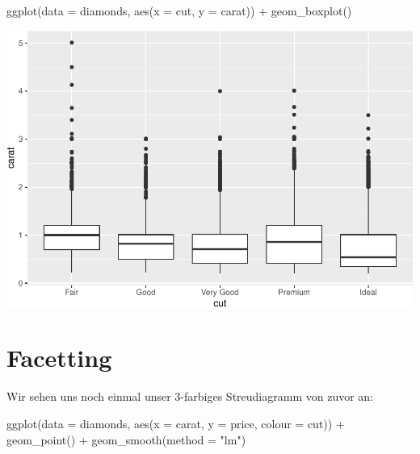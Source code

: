 \documentclass[
]{book}
\newenvironment{Shaded}{\begin{snugshade}}{\end{snugshade}}
\newcommand{\AttributeTok}[1]{\textcolor[rgb]{0.77,0.63,0.00}{#1}}
\newcommand{\FunctionTok}[1]{\textcolor[rgb]{0.00,0.00,0.00}{#1}}
\newcommand{\NormalTok}[1]{#1}
\newcommand{\SpecialCharTok}[1]{\textcolor[rgb]{0.00,0.00,0.00}{#1}}
\newcommand{\StringTok}[1]{\textcolor[rgb]{0.31,0.60,0.02}{#1}}
\begin{document}
\begin{Shaded}
\begin{Highlighting}[]
\FunctionTok{ggplot}\NormalTok{(}\AttributeTok{data =}\NormalTok{ diamonds, }\FunctionTok{aes}\NormalTok{(}\AttributeTok{x =}\NormalTok{ cut, }\AttributeTok{y =}\NormalTok{ carat)) }\SpecialCharTok{+}
  \FunctionTok{geom\_boxplot}\NormalTok{()}
\end{Highlighting}
\end{Shaded}

\includegraphics{CFH_R_bookdown_files/figure-latex/unnamed-chunk-169-1.pdf}

\hypertarget{facetting}{%
\section{Facetting}\label{facetting}}

Wir sehen uns noch einmal unser 3-farbiges Streudiagramm von zuvor an:

\begin{Shaded}
\begin{Highlighting}[]
\FunctionTok{ggplot}\NormalTok{(}\AttributeTok{data =}\NormalTok{ diamonds, }\FunctionTok{aes}\NormalTok{(}\AttributeTok{x =}\NormalTok{ carat, }\AttributeTok{y =}\NormalTok{ price, }\AttributeTok{colour =}\NormalTok{ cut)) }\SpecialCharTok{+}
  \FunctionTok{geom\_point}\NormalTok{() }\SpecialCharTok{+}
  \FunctionTok{geom\_smooth}\NormalTok{(}\AttributeTok{method =} \StringTok{"lm"}\NormalTok{)}
\end{Highlighting}
\end{Shaded}
\end{document}
